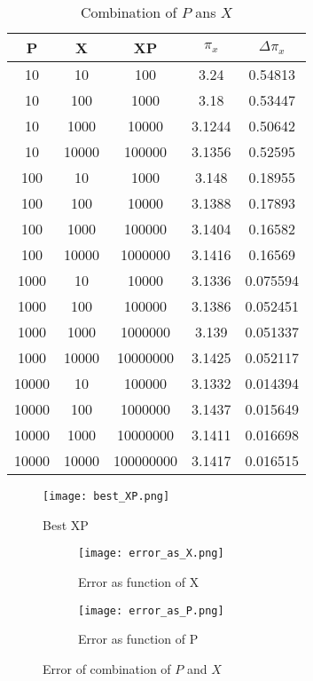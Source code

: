 \documentclass[titlepage]{scrartcl}
\begin{document}
\begin{table}[htp]
    \centering
    \caption{Combination of $P$ ans $X$}\label{tab:combi}
    \begin{tabular}{|c|c|c|c|c|}
        \hline
        P & X & XP & $\pi_x$ & $\Delta \pi_x$ \\\hline

        10 & 10 & 100 & 3.24 & 0.54813 \\ 
        10 & 100 & 1000 & 3.18 & 0.53447 \\ 
        10 & 1000 & 10000 & 3.1244 & 0.50642 \\ 
        10 & 10000 & 100000 & 3.1356 & 0.52595 \\ 
        100 & 10 & 1000 & 3.148 & 0.18955 \\ 
        100 & 100 & 10000 & 3.1388 & 0.17893 \\ 
        100 & 1000 & 100000 & 3.1404 & 0.16582 \\ 
        100 & 10000 & 1000000 & 3.1416 & 0.16569 \\ 
        1000 & 10 & 10000 & 3.1336 & 0.075594 \\ 
        1000 & 100 & 100000 & 3.1386 & 0.052451 \\ 
        1000 & 1000 & 1000000 & 3.139 & 0.051337 \\ 
        1000 & 10000 & 10000000 & 3.1425 & 0.052117 \\ 
        10000 & 10 & 100000 & 3.1332 & 0.014394 \\ 
        10000 & 100 & 1000000 & 3.1437 & 0.015649 \\ 
        10000 & 1000 & 10000000 & 3.1411 & 0.016698 \\ 
        10000 & 10000 & 100000000 & 3.1417 & 0.016515 \\  \hline
    \end{tabular}
\end{table}

\begin{figure}
    \centering
    \texttt{[image: best\_XP.png]}
    \caption[OBE]{Best XP}\label{fig:best_XP}
\end{figure}

\begin{figure}[htp]
    \begin{subfigure}{0.45\textwidth}
    \centering
    \texttt{[image: error\_as\_X.png]}
    \caption[EAX]{Error as function of X}\label{fig:error_as_X}
    \end{subfigure}
    \begin{subfigure}{0.45\textwidth}
        \centering
        \texttt{[image: error\_as\_P.png]}
        \caption[EAp]{Error as function of P}\label{fig:error_as_P}
        \end{subfigure}
    \caption{Error of combination of $P$ and $X$}
\end{figure}
\end{document}
